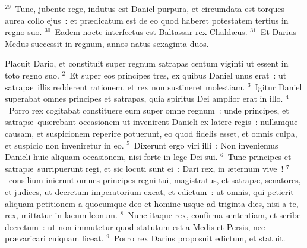 ${}^{29}$~Tunc, jubente rege, indutus est Daniel purpura, et circumdata est torques aurea collo ejus~: et pr\ae dicatum est de eo quod haberet potestatem tertius in regno suo.
${}^{30}$~Eadem nocte interfectus est Baltassar rex Chald\ae us.
${}^{31}$~Et Darius Medus successit in regnum, annos natus sexaginta duos.

\bchapter
\lettrine[lines=3,image=true,loversize=0.05,lraise=-0.03]{P}{}lacuit Dario, et constituit super regnum satrapas centum viginti ut essent in toto regno suo.
${}^{2}$~Et super eos principes tres, ex quibus Daniel unus erat~: ut satrap\ae\ illis redderent rationem, et rex non sustineret molestiam.
${}^{3}$~Igitur Daniel superabat omnes principes et satrapas, quia spiritus Dei amplior erat in illo.
${}^{4}$~Porro rex cogitabat constituere eum super omne regnum~: unde principes, et satrap\ae\ qu\ae rebant occasionem ut invenirent Danieli ex latere regis~: nullamque causam, et suspicionem reperire potuerunt, eo quod fidelis esset, et omnis culpa, et suspicio non inveniretur in eo.
${}^{5}$~Dixerunt ergo viri illi~: Non inveniemus Danieli huic aliquam occasionem, nisi forte in lege Dei sui.
${}^{6}$~Tunc principes et satrap\ae\ surripuerunt regi, et sic locuti sunt ei~: Dari rex, in \ae ternum vive~!
${}^{7}$~consilium inierunt omnes principes regni tui, magistratus, et satrap\ae , senatores, et judices, ut decretum imperatorium exeat, et edictum~: ut omnis, qui petierit aliquam petitionem a quocumque deo et homine usque ad triginta dies, nisi a te, rex, mittatur in lacum leonum.
${}^{8}$~Nunc itaque rex, confirma sententiam, et scribe decretum~: ut non immutetur quod statutum est a Medis et Persis, nec pr\ae varicari cuiquam liceat.
${}^{9}$~Porro rex Darius proposuit edictum, et statuit.


